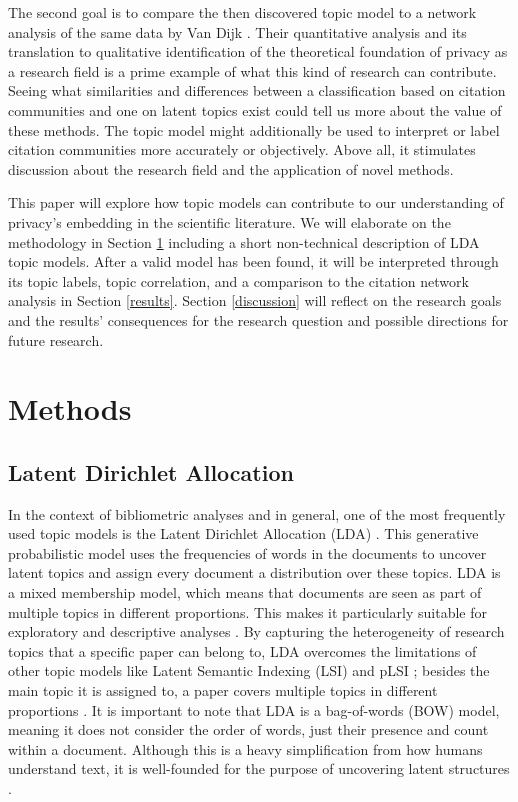 \documentclass[runningheads]{llncs}
\begin{document}
The second goal is to compare the then discovered topic model to a network analysis of the same data by Van Dijk \cite{van_dijk_pillars_nodate}. Their quantitative analysis and its translation to qualitative identification of the theoretical foundation of privacy as a research field is a prime example of what this kind of research can contribute. Seeing what similarities and differences between a classification based on citation communities and one on latent topics exist could tell us more about the value of these methods. The topic model might additionally be used to interpret or label citation communities more accurately or objectively. Above all, it stimulates discussion about the research field and the application of novel methods.

This paper will explore how topic models can contribute to our understanding of privacy’s embedding in the scientific literature. We will elaborate on the methodology in Section \ref{Methods} including a short non-technical description of LDA topic models. After a valid model has been found, it will be interpreted through its topic labels, topic correlation, and a comparison to the citation network analysis in Section \ref{results}. Section \ref{discussion} will reflect on the research goals and the results’ consequences for the research question and possible directions for future research.


\section{Methods} 
\label{Methods} 
\subsection{Latent Dirichlet Allocation}
In the context of bibliometric analyses and in general, one of the most frequently used topic models is the Latent Dirichlet Allocation (LDA) \cite{blei2003latent}. This generative probabilistic model uses the frequencies of words in the documents to uncover latent topics and assign every document a distribution over these topics. LDA is a mixed membership model, which means that documents are seen as part of multiple topics in different proportions. This makes it particularly suitable for exploratory and descriptive analyses \cite{elgesem2015structure}. By capturing the heterogeneity of research topics that a specific paper can belong to, LDA overcomes the limitations of other topic models like Latent Semantic Indexing (LSI) \cite{dumais1994latent} and pLSI \cite{hofmann1999probabilistic}; besides the main topic it is assigned to, a paper covers multiple topics in different proportions \cite{syed_full-text_2017}. It is important to note that LDA is a bag-of-words (BOW) model, meaning it does not consider the order of words, just their presence and count within a document. Although this is a heavy simplification from how humans understand text, it is well-founded for the purpose of uncovering latent structures \cite{blei_dynamic_2006}.
\end{document}
